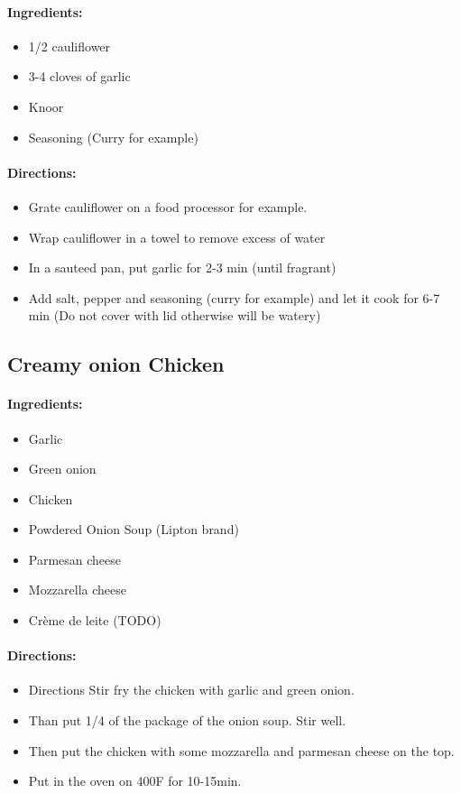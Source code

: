 \documentclass{article}
\begin{document}
\paragraph{Ingredients:}

\begin{itemize}
	\item 1/2 cauliflower
	\item 3-4 cloves of garlic
	\item Knoor
	\item Seasoning (Curry for example)
\end{itemize}

\paragraph{Directions:}
\begin{itemize}
	\item Grate cauliflower on a food processor for example.
	\item Wrap cauliflower in a towel to remove excess of water
	\item In a sauteed pan, put garlic for 2-3 min (until fragrant)
	\item Add salt, pepper and seasoning (curry for example) and let it cook for 6-7 min (Do not cover with lid otherwise will be watery)
\end{itemize}

\subsection{Creamy onion Chicken}

\paragraph{Ingredients:}

\begin{itemize}
	\item Garlic 
	\item Green onion 
	\item Chicken 
	\item Powdered Onion Soup (Lipton brand) 
	\item Parmesan cheese 
	\item Mozzarella cheese 
	\item Crème de leite (TODO)
\end{itemize}

\paragraph{Directions:}
\begin{itemize}
	\item Directions Stir fry the chicken with garlic and green onion. 
	\item Than put 1/4 of the package of the onion soup. Stir well.
	\item Then put the chicken with some mozzarella and parmesan cheese on the top. 
	\item Put in the oven on 400F for 10-15min.
\end{itemize}
\end{document}

